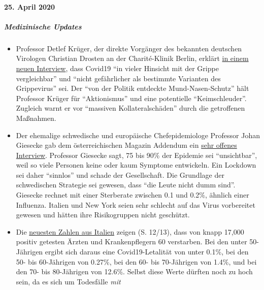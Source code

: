 \hypertarget{25-april-2020}{%
\paragraph{25. April 2020}\label{25-april-2020}}

\hypertarget{medizinische-updates}{%
\subparagraph{\texorpdfstring{\textbf{Medizinische
Updates}}{Medizinische Updates}}\label{medizinische-updates}}

\begin{itemize}
\tightlist
\item
  Professor Detlef Krüger, der direkte Vorgänger des bekannten deutschen
  Virologen Christian Drosten an der Charité-Klinik Berlin, erklärt
  \href{https://de.sputniknews.com/interviews/20200425326953541-corona-gefahr-virologe/}{in
  einem neuen Interview}, dass Covid19 ``in vieler Hinsicht mit der
  Grippe vergleichbar'' und ``nicht gefährlicher als bestimmte Varianten
  des Grippevirus'' sei. Der ``von der Politik entdeckte
  Mund-Nasen-Schutz'' hält Professor Krüger für ``Aktionismus'' und eine
  potentielle ``Keimschleuder''. Zugleich warnt er vor ``massiven
  Kollateralschäden'' durch die getroffenen Maßnahmen.
\item
  Der ehemalige schwedische und europäische Chefepidemiologe Professor
  Johan Giesecke gab dem österreichischen Magazin Addendum ein
  \href{https://www.addendum.org/coronavirus/interview-johan-giesecke/}{sehr
  offenes Interview}. Professor Giesecke sagt, 75 bis 90\% der Epidemie
  sei ``unsichtbar'', weil so viele Personen keine oder kaum Symptome
  entwickeln. Ein Lockdown sei daher ``sinnlos'' und schade der
  Gesellschaft. Die Grundlage der schwedischen Strategie sei gewesen,
  dass ``die Leute nicht dumm sind''. Giesecke rechnet mit einer
  Sterberate zwischen 0.1 und 0.2\%, ähnlich einer Influenza. Italien
  und New York seien sehr schlecht auf das Virus vorbereitet gewesen und
  hätten ihre Risikogruppen nicht geschützt.
\item
  Die
  \href{https://www.epicentro.iss.it/coronavirus/bollettino/Bollettino-sorveglianza-integrata-COVID-19_16-aprile-2020.pdf\#page=13}{neuesten
  Zahlen aus Italien} zeigen (S. 12/13), dass von knapp 17,000 positiv
  getesten Ärzten und Krankenpflegern 60 verstarben. Bei den unter
  50-Jährigen ergibt sich daraus eine Covid19-Letalität von unter 0.1\%,
  bei den 50- bis 60-Jährigen von 0.27\%, bei den 60- bis 70-Jährigen
  von 1.4\%, und bei den 70- bis 80-Jährigen von 12.6\%. Selbst diese
  Werte dürften noch zu hoch sein, da es sich um Todesfälle \emph{mit}

\end{itemize}
